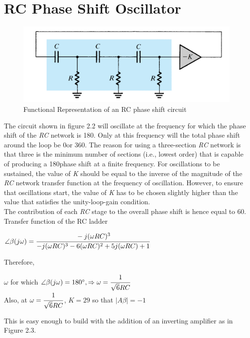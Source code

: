 \documentclass[12pt]{report}
\begin{document}
\section{RC Phase Shift Oscillator}
\label{sec:PhaseShiftTheory}
\begin{large}
\begin{figure}[ht]
    \centering
    \includegraphics[scale=0.3]{figs/theory_phase_shift.png}
    \caption{Functional Representation of an RC phase shift circuit \cite{Sedra}}
    \label{fig:theoryRC}
\end{figure}

The circuit shown in figure 2.2 will oscillate at the frequency for which the phase shift of the \textit{RC} network is 180\degree. Only at this frequency will the total phase shift around the loop be 0\degree or 360\degree. The reason for using a three-section \textit{RC} network is that three is the minimum number of sections (i.e., lowest order) that is capable of producing a 180\degree phase shift at a finite frequency. For oscillations to be sustained, the value of \textit{K} should be equal to the inverse of the magnitude of the \textit{RC} network transfer function at the frequency of oscillation. However, to ensure that oscillations start, the value of \textit{K} has to be chosen slightly higher than the value that satisfies the unity-loop-gain condition.\\

The contribution of each \textit{RC} stage to the overall phase shift is hence equal to 60\degree.\\

Transfer function of the RC ladder 
\begin{center}
$\angle\beta(j\omega) = \cfrac{-j(\omega RC)^3}{-j(\omega RC)^3-6(\omega RC)^2+5j(\omega RC)+1}$\\
\end{center}

Therefore,

\begin{center}
$\omega$ for which $\angle \beta (j\omega) = 180 \degree, \Rightarrow \omega = \cfrac{1}{\sqrt{6}RC}$\\

Also, at $\omega = \cfrac{1}{\sqrt{6}RC}$, $K = 29$ so that $|A\beta| = -1$
\end{center}

This is easy enough to build with the addition of an inverting amplifier as in Figure 2.3.
\end{large}
\end{document}
